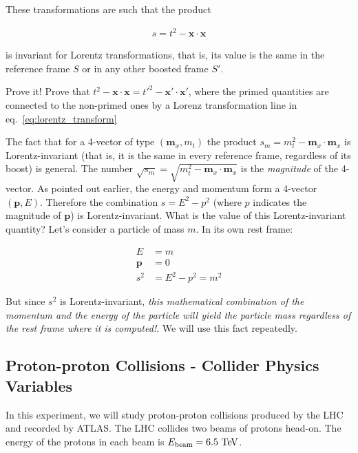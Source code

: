These transformations are such that the product 

\begin{align*}
s = t^2 - \mathbf{x} \cdot \mathbf{x}
\end{align*}

\noindent is invariant for Lorentz transformations, that is, its value is the same in the reference frame $S$ or in any other boosted frame $S'$. 

\begin{mybox}
\begin{ExerciseList}
\Exercise Prove it! Prove that  $t^2 - \mathbf{x} \cdot \mathbf{x} =  t'^2 - \mathbf{x'} \cdot \mathbf{x'}$, where the primed quantities are connected to the non-primed ones by a Lorenz transformation line in eq.~\ref{eq:lorentz_transform}
\end{ExerciseList}
\end{mybox}

The fact that for a 4-vector of type $\left(\mathbf{m}_x, m_t\right)$ the product $s_{m} = m_t^2 - \mathbf{m}_x \cdot \mathbf{m}_x$ is Lorentz-invariant (that is, it is the same in every reference frame, regardless of its boost) is general. The number $\sqrt{s_{m}} = \sqrt{m_t^2 - \mathbf{m}_x \cdot \mathbf{m}_x}$ is the \textit{magnitude} of the 4-vector. As pointed out earlier, the energy and momentum form a 4-vector $\left(\mathbf{p},E\right)$. Therefore the combination $s = E^2-p^2$ (where $p$ indicates the magnitude of $\mathbf{p}$) is Lorentz-invariant. What is the value of this Lorentz-invariant quantity? Let's consider a particle of mass $m$. In its own rest frame: 

\begin{align*} 
E &= m \\ 
\mathbf{p} &= 0 \\ 
s^2 &= E^2 - p^2 = m^2
\end{align*}

\noindent But since $s^2$ is Lorentz-invariant, \textit{this mathematical combination of the momentum and the energy of the particle will yield the particle mass regardless of the rest frame where it is computed!}. We will use this fact repeatedly.

\subsection{Proton-proton Collisions - Collider Physics Variables}

In this experiment, we will study proton-proton collisions produced by the LHC and recorded by ATLAS. The LHC collides two beams of protons head-on. The energy of the protons in each beam is $E_{\mathrm{beam}} = 6.5\ \text{Te\kern -0.1em V}$. 

